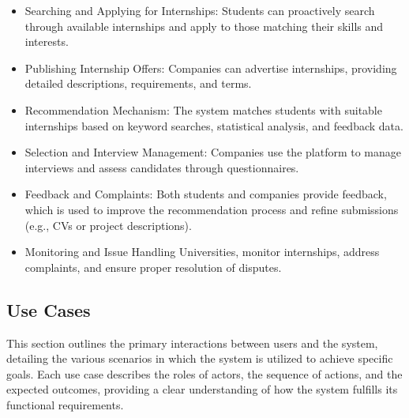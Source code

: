 \begin{itemize}
\item Searching and Applying for Internships:
Students can proactively search through available internships and apply to those matching their skills and interests.

\item Publishing Internship Offers:
Companies can advertise internships, providing detailed descriptions, requirements, and terms.

\item Recommendation Mechanism:
The system matches students with suitable internships based on keyword searches, statistical analysis, and feedback data.

\item Selection and Interview Management:
Companies use the platform to manage interviews and assess candidates through questionnaires.

\item Feedback and Complaints:
Both students and companies provide feedback, which is used to improve the recommendation process and refine submissions (e.g., CVs or project descriptions).

\item Monitoring and Issue Handling
Universities, monitor internships, address complaints, and ensure proper resolution of disputes.
\end {itemize}

\subsection{Use Cases}
This section outlines the primary interactions between users and the system, 
detailing the various scenarios in which the system is utilized to achieve specific goals. 
Each use case describes the roles of actors, the sequence of actions, and the expected outcomes, 
providing a clear understanding of how the system fulfills its functional requirements. 

